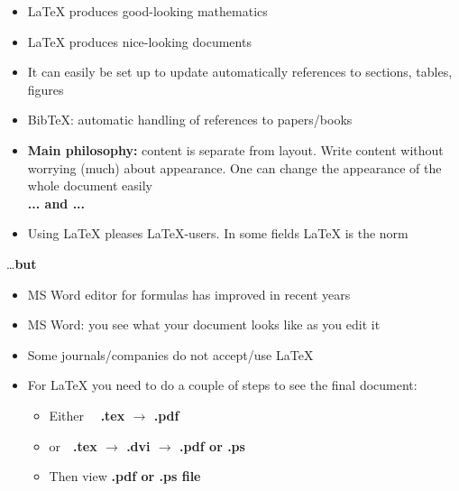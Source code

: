\documentclass{beamer}             %
\begin{document}
\begin{frame}
\begin{itemize}
\setlength{\itemsep}{.2cm}
\item LaTeX produces good-looking mathematics %
\item LaTeX produces nice-looking documents %
\item It can easily be set up to update automatically references to sections, tables, figures %
\item BibTeX: automatic handling of references to papers/books %
\item {\bf \alert{Main philosophy:}} content is separate from layout. Write content without worrying (much) about appearance.
  One can change the appearance of the whole document easily \\
\medskip
\alert{\bf ... and ...}
\medskip
\item Using LaTeX pleases LaTeX-users. In some fields LaTeX is the norm
\end{itemize}
\end{frame}


\begin{frame}
\ldots \alert{\bf but}\\
\medskip
\begin{itemize}
\setlength{\itemsep}{.3cm}
\item MS Word editor for formulas has improved in recent years
\item MS Word: you see what your document looks like as you edit it
\item Some journals/companies do not accept/use LaTeX
\item For LaTeX you need to do a couple of steps to see the final document:
\begin{itemize}
\setlength{\itemsep}{.2cm}
\item Either \ \ \alert{\bf .tex $\rightarrow$ .pdf}
\item or\ \  \alert{\bf .tex $\rightarrow$ .dvi $\rightarrow$ .pdf or .ps}
\item Then view \alert{\bf .pdf or .ps file}
\end{itemize}
\end{itemize}
\end{frame}
\end{document}
